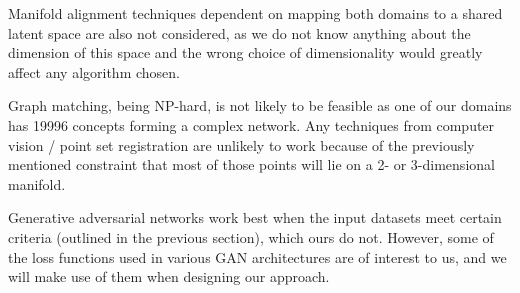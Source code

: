 Manifold alignment techniques dependent on mapping both domains to a shared latent space are also not considered, as we do not know anything about the dimension of this space and the wrong choice of dimensionality would greatly affect any algorithm chosen.

Graph matching, being NP-hard, is not likely to be feasible as one of our domains has 19996 concepts forming a complex network. Any techniques from computer vision / point set registration are unlikely to work because of the previously mentioned constraint that most of those points will lie on a 2- or 3-dimensional manifold. 

Generative adversarial networks work best when the input datasets meet certain criteria (outlined in the previous section), which ours do not. However, some of the loss functions used in various GAN architectures are of interest to us, and we will make use of them when designing our approach. 

